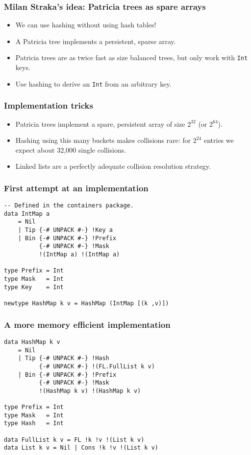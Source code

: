 \documentclass{beamer}
\begin{document}
\begin{frame}
  \frametitle{Milan Straka's idea: Patricia trees as spare arrays}
  \begin{itemize}
  \item We can use hashing without using hash tables!
  \item A Patricia tree implements a persistent, sparse array.
  \item Patricia trees are as twice fast as size balanced trees, but
    only work with \lstinline!Int! keys.
  \item Use hashing to derive an \lstinline!Int! from an arbitrary
    key.
  \end{itemize}
\end{frame}

\begin{frame}
  \frametitle{Implementation tricks}
  \begin{itemize}
  \item Patricia trees implement a spare, persistent array of size
    $2^{32}$ (or $2^{64}$).
  \item Hashing using this many buckets makes collisions rare: for
    $2^{24}$ entries we expect about 32,000 single collisions.
  \item Linked lists are a perfectly adequate collision resolution
    strategy.
  \end{itemize}
\end{frame}

\begin{frame}[fragile]
  \frametitle{First attempt at an implementation}
  \begin{lstlisting}
-- Defined in the containers package.
data IntMap a
    = Nil
    | Tip {-# UNPACK #-} !Key a
    | Bin {-# UNPACK #-} !Prefix
          {-# UNPACK #-} !Mask
          !(IntMap a) !(IntMap a)

type Prefix = Int
type Mask   = Int
type Key    = Int

newtype HashMap k v = HashMap (IntMap [(k ,v)])
  \end{lstlisting}
\end{frame}


\begin{frame}[fragile]
  \frametitle{A more memory efficient implementation}
  \begin{lstlisting}
data HashMap k v
    = Nil
    | Tip {-# UNPACK #-} !Hash
          {-# UNPACK #-} !(FL.FullList k v)
    | Bin {-# UNPACK #-} !Prefix
          {-# UNPACK #-} !Mask
          !(HashMap k v) !(HashMap k v)

type Prefix = Int
type Mask   = Int
type Hash   = Int

data FullList k v = FL !k !v !(List k v)
data List k v = Nil | Cons !k !v !(List k v)
  \end{lstlisting}
\end{frame}
\end{document}
